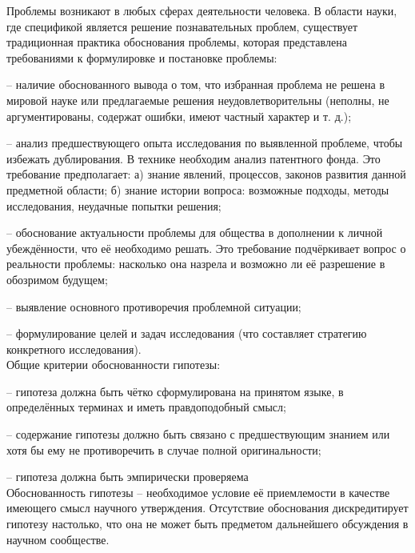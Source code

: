 \documentclass[exam_answers.tex]{subfiles}
\begin{document}
\renewcommand{\baselinestretch}{\blch}

Проблемы возникают в любых сферах деятельности человека.
В области науки, где спецификой является решение познавательных проблем, существует традиционная практика обоснования проблемы, которая представлена требованиями к формулировке и постановке проблемы:

-- наличие обоснованного вывода о том, что избранная проблема не решена в мировой науке или предлагаемые решения неудовлетворительны (неполны, не аргументированы, содержат ошибки, имеют частный характер и т. д.);

-- анализ предшествующего опыта исследования по выявленной проблеме, чтобы избежать дублирования. В технике необходим анализ патентного фонда.
Это требование предполагает:
а) знание явлений, процессов, законов развития данной предметной области;
б) знание истории вопроса: возможные подходы, методы исследования, неудачные попытки решения;

-- обоснование актуальности проблемы для общества в дополнении к личной убеждённости, что её необходимо решать.
Это требование подчёркивает вопрос о реальности проблемы: насколько она назрела и возможно ли её разрешение в обозримом будущем;

-- выявление основного противоречия проблемной ситуации;

-- формулирование целей и задач исследования (что составляет стратегию конкретного исследования).
\\

Общие критерии обоснованности гипотезы:

-- гипотеза должна быть чётко сформулирована на принятом языке, в определённых терминах и иметь правдоподобный смысл;

-- содержание гипотезы должно быть связано с предшествующим знанием или хотя бы ему не противоречить в случае полной оригинальности;

-- гипотеза должна быть эмпирически проверяема
\\

Обоснованность гипотезы – необходимое условие её приемлемости в качестве имеющего смысл научного утверждения.
Отсутствие обоснования дискредитирует гипотезу настолько, что она не может быть предметом дальнейшего обсуждения в научном сообществе.
\end{document}

